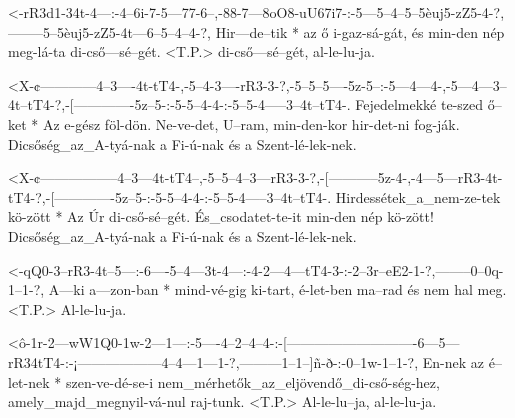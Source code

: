   {<-rR3d1-34t-4---:-4--6i-7-5---77-6--,-88-7---8oO8-uU67i7-:-5---5--4--5--5èuj5-zZ5-4-?,--------5--5èuj5-zZ5-4t---6--5--4--4-?,}
  {  Hir---de--tik * az ő  i-gaz-sá-gát, és min-den  nép      meg-lá-ta di-cső---sé--gét. <T.P.> di-cső---sé--gét, al-le-lu-ja.}


  {<X-¢------------4--3----4t-tT4-,-5--4-3----rR3-3-?,-5--5--5----5z-5--:-5---4---4-,-5---4---3--4t--tT4-?,-[-------------5z--5-:-5-5--4-4-:-5--5-4-----3--4t--tT4-.}
  {   Fejedelmekké te-szed ő--ket * Az e-gész föl-dön. Ne-ve-det, U--ram, min-den-kor hir-det-ni fog-ják.   Dicsőség_az_A-tyá-nak a Fi-ú-nak és a Szent-lé-lek-nek.}


  {<X-¢-----------------4--3---4t-tT4--,-5--5--4--3---rR3-3-?,-[-----------5z-4-,-4---5---rR3-4t-tT4-?,-[-------------5z--5-:-5-5--4-4-:-5--5-4-----3--4t--tT4-.}
  {   Hirdessétek_a_nem-ze-tek kö-zött * Az Úr di-cső-sé--gét. És_csodatet-te-it  min-den nép kö-zött!  Dicsőség_az_A-tyá-nak a Fi-ú-nak és a Szent-lé-lek-nek.}



  {<-qQ0-3--rR3-4t--5---:-6----5--4---3t-4---:-4-2---4---tT4-3-:-2--3r--eE2-1-?,--------0--0q-1--1-?,}
  {  A---ki a---zon-ban * mind-vé-gig ki-tart, é-let-ben ma--rad és nem hal meg. <T.P.> Al-le-lu-ja.}

  {<ô-1r-2---wW1Q0-1w-2---1---:-5----4--2--4--4-:-[----------------------------6---5---rR34tT4-:-¡------------------4--4---1---1-?,---------1--1--]ñ-ð-:-0--1w-1--1-?,}
  {   En-nek az    é--let-nek * szen-ve-dé-se-i   nem_mérhetők_az_eljövendő_di-cső-ség-hez,      amely_majd_megnyil-vá-nul raj-tunk. <T.P.> Al-le-lu--ja, al-le-lu-ja.}

